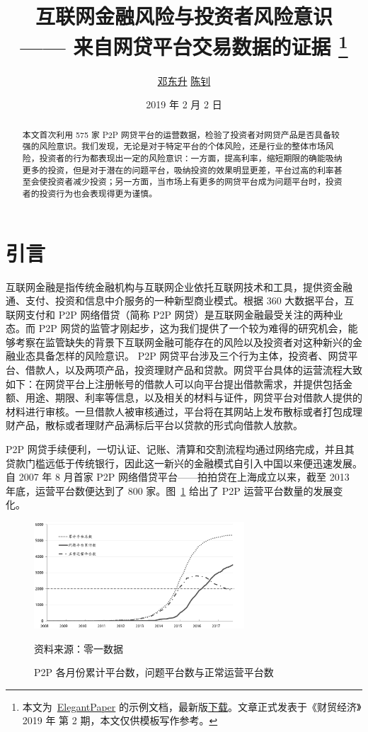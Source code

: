 \documentclass[lang=cn,11pt]{elegantpaper}
\title{互联网金融风险与投资者风险意识 \\ {\large —— 来自网贷平台交易数据的证据}
\footnote{本文为~\href{https://github.com/ElegantLaTeX/ElegantPaper}{ElegantPaper} 的示例文档，最新版\href{https://github.com/EthanDeng/risk-awareness}{下载}。文章正式发表于《财贸经济》2019 年 第 2 期，本文仅供模板写作参考。}}
\author{\href{https://ddswhu.me/}{邓东升} \quad \href{http://www.cces.fudan.edu.cn/researchdetail.aspx?id=6}{陈钊}}
\institute{复旦大学 \; 经济学院 \\ 中国社会主义市场经济研究中心}
\date{2019 年 2 月 2 日}
\begin{document}
\maketitle

\begin{abstract}
本文首次利用 575 家 P2P 网贷平台的运营数据，检验了投资者对网贷产品是否具备较强的风险意识。我们发现，无论是对于特定平台的个体风险，还是行业的整体市场风险，投资者的行为都表现出一定的风险意识：一方面，提高利率，缩短期限的确能吸纳更多的投资，但是对于潜在的问题平台，吸纳投资的效果明显更差，平台过高的利率甚至会使投资者减少投资；另一方面，当市场上有更多的网贷平台成为问题平台时，投资者的投资行为也会表现得更为谨慎。
\end{abstract}

\section{引言}

互联网金融是指传统金融机构与互联网企业依托互联网技术和工具，提供资金融通、支付、投资和信息中介服务的一种新型商业模式。根据 360 大数据平台，互联网支付和 P2P 网络借贷（简称 P2P 网贷）是互联网金融最受关注的两种业态。而 P2P 网贷的监管才刚起步，这为我们提供了一个较为难得的研究机会，能够考察在监管缺失的背景下互联网金融可能存在的风险以及投资者对这种新兴的金融业态具备怎样的风险意识。
P2P 网贷平台涉及三个行为主体，投资者、网贷平台、借款人，以及两项产品，投资理财产品和贷款。网贷平台具体的运营流程大致如下：在网贷平台上注册帐号的借款人可以向平台提出借款需求，并提供包括金额、用途、期限、利率等信息，以及相关的材料与证件，网贷平台对借款人提供的材料进行审核。一旦借款人被审核通过，平台将在其网站上发布散标或者打包成理财产品，散标或者理财产品满标后平台以贷款的形式向借款人放款。

P2P 网贷手续便利，一切认证、记账、清算和交割流程均通过网络完成，并且其贷款门槛远低于传统银行，因此这一新兴的金融模式自引入中国以来便迅速发展。自 2007 年 8 月首家 P2P 网络借贷平台——拍拍贷在上海成立以来，截至 2013 年底，运营平台数便达到了 800 家。图~\ref{fig:dev} 给出了 P2P 运营平台数量的发展变化。

\begin{figure}[htbp]
\centering
\includegraphics[width=0.7\textwidth]{figure/development_gray.png}
\caption{P2P 各月份累计平台数，问题平台数与正常运营平台数 \label{fig:dev}}
{\fontsize{8pt}{10pt}\selectfont\parbox{0.7\textwidth}{资料来源：零一数据}}
\end{figure}
\end{document}
